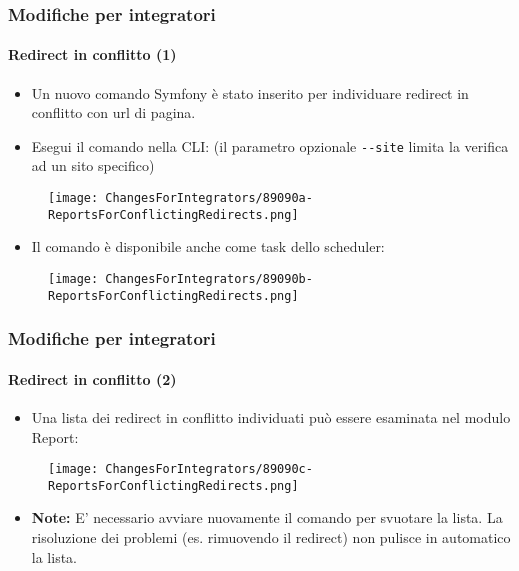 \begin{frame}[fragile]
	\frametitle{Modifiche per integratori}
	\framesubtitle{Redirect in conflitto (1)}

	\begin{itemize}
		\item Un nuovo comando Symfony è stato inserito per individuare redirect
			in conflitto con url di pagina.
		\item Esegui il comando nella CLI:\newline
			\smaller
				(il parametro opzionale \texttt{-}\texttt{-site} limita la verifica ad un sito specifico)
			\normalsize
	\end{itemize}

	\begin{figure}
		\texttt{[image: ChangesForIntegrators/89090a-ReportsForConflictingRedirects.png]}
	\end{figure}

	\begin{itemize}
		\item Il comando è disponibile anche come task dello scheduler:
	\end{itemize}

	\begin{figure}
		\texttt{[image: ChangesForIntegrators/89090b-ReportsForConflictingRedirects.png]}
	\end{figure}

\end{frame}


\begin{frame}[fragile]
	\frametitle{Modifiche per integratori}
	\framesubtitle{Redirect in conflitto (2)}

	\begin{itemize}
		\item Una lista dei redirect in conflitto individuati può essere esaminata nel modulo Report:
	\end{itemize}

	\begin{figure}
		\texttt{[image: ChangesForIntegrators/89090c-ReportsForConflictingRedirects.png]}
	\end{figure}

	\begin{itemize}
		\item
			\small\textbf{Note:}
				E' necessario avviare nuovamente il comando per svuotare la lista.
				La risoluzione dei problemi (es. rimuovendo il redirect) non pulisce in automatico la lista.
			\normalsize
	\end{itemize}

\end{frame}

